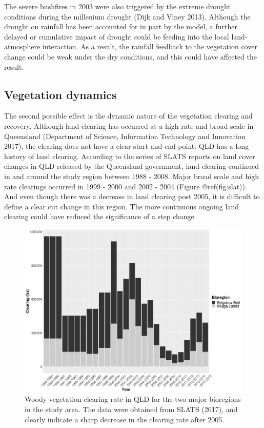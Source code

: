\documentclass[fleqn,10pt,lineno]{wlpeerj} %
\begin{document}
The severe bushfires in 2003 were also triggered by the extreme drought
conditions during the millenium drought (Dijk and Viney 2013). Although
the drought on rainfall has been accounted for in part by the model, a
further delayed or cumulative impact of drought could be feeding into
the local land-atmosphere interaction. As a result, the rainfall
feedback to the vegetation cover change could be weak under the dry
conditions, and this could have affected the result.

\subsection{Vegetation dynamics}\label{vegetation-dynamics}

The second possible effect is the dynamic nature of the vegetation
clearing and recovery. Although land clearing has occurred at a high
rate and broad scale in Queensland (Department of Science, Information
Technology and Innovation 2017), the clearing does not have a clear
start and end point. QLD has a long history of land clearing. According
to the series of SLATS reports on land cover changes in QLD released by
the Queensland government, land clearing continued in and around the
study region between 1988 - 2008. Major broad scale and high rate
clearings occurred in 1999 - 2000 and 2002 - 2004 (Figure
@ref(fig:slat)). And even though there was a decrease in land clearing
post 2005, it is difficult to define a clear cut change in this region.
The more continuous ongoing land clearing could have reduced the
significance of a step change.

\begin{figure}
\includegraphics[width=0.9\linewidth]{figures/slats} \caption{Woody vegetation clearing rate in QLD for the two major bioregions in the study area. The data were obtained from SLATS (2017), and clearly indicate a sharp decrease in the clearing rate after 2005.}\label{fig:slat}
\end{figure}
\end{document}
